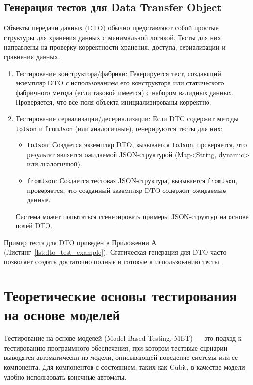 \documentclass[14pt, russian]{scrartcl}
\begin{document}
\subsection{Генерация тестов для Data Transfer Object}

Объекты передачи данных (DTO) обычно представляют собой простые структуры для хранения данных с минимальной логикой. Тесты для них направлены на проверку корректности хранения, доступа, сериализации и сравнения данных.

\begin{enumerate}
    \item {Тестирование конструктора/фабрики:} Генерируется тест, создающий экземпляр DTO с использованием его конструктора или статического фабричного метода (если таковой имеется) с набором валидных данных. Проверяется, что все поля объекта инициализированы корректно.
    \item {Тестирование сериализации/десериализации:} Если DTO содержит методы \texttt{toJson} и \texttt{fromJson} (или аналогичные), генерируются тесты для них:
        \begin{itemize}
            \item \texttt{toJson}: Создается экземпляр DTO, вызывается \texttt{toJson}, проверяется, что результат является ожидаемой JSON-структурой (Map<String, dynamic> или аналогичной).
            \item \texttt{fromJson}: Создается тестовая JSON-структура, вызывается \texttt{fromJson}, проверяется, что созданный экземпляр DTO содержит ожидаемые данные.
        \end{itemize}
        Система может попытаться сгенерировать примеры JSON-структур на основе полей DTO.
\end{enumerate}

Пример теста для DTO приведен в Приложении А (Листинг~\ref{lst:dto_test_example}). Статическая генерация для DTO часто позволяет создать достаточно полные и готовые к использованию тесты.

\section{Теоретические основы тестирования на основе моделей}

Тестирование на основе моделей (Model-Based Testing, MBT) — это подход к тестированию программного обеспечения, при котором тестовые сценарии выводятся автоматически из модели, описывающей поведение системы или ее компонента. Для компонентов с состоянием, таких как Cubit, в качестве модели удобно использовать конечные автоматы.
\end{document}
